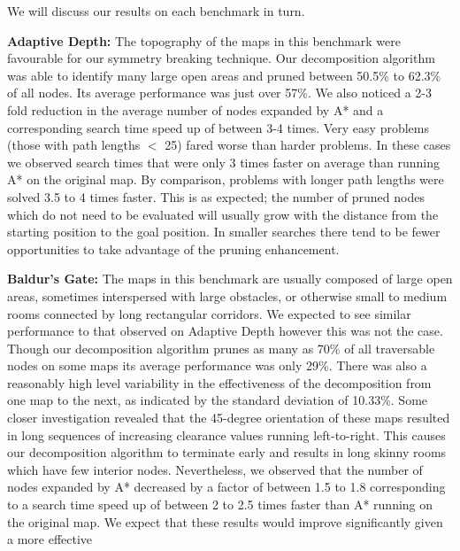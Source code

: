 We will discuss our results on each benchmark in turn.

\textbf{Adaptive Depth:} 
The topography of the maps in this benchmark were favourable for our
symmetry breaking technique.
Our decomposition algorithm was able to identify many large open areas and
pruned between 50.5\% to 62.3\% of all nodes.
Its average performance was just over 57\%. 
We also noticed a 2-3 fold reduction in the average number of nodes expanded 
by A* and a corresponding search time speed up of between 3-4 times.
Very easy problems (those with path lengths $<$ 25) fared worse than harder
problems. 
In these cases we observed search times that were only 3 times faster on average 
than running A* on the original map. 
By comparison, problems with longer path lengths were solved 3.5 to 4 times faster.
This is as expected; the number of pruned nodes which do not need to be evaluated
will usually grow with the distance from the starting position to the goal
position. In smaller searches there tend to be fewer opportunities to take advantage 
of the pruning enhancement.
%
\par
\textbf{Baldur's Gate: }
The maps in this benchmark are usually composed of large open areas, sometimes
interspersed with large obstacles, or otherwise small to medium rooms connected
by long rectangular corridors.
We expected to see similar performance to that observed on Adaptive Depth
however this was not the case.
Though our decomposition algorithm prunes as many as 70\% of all traversable nodes 
on some maps its average performance was only 29\%. 
There was also a reasonably high level variability in the effectiveness of the 
decomposition from one map to the next, as indicated by the standard deviation
of 10.33\%.
Some closer investigation revealed that the 45-degree orientation of these maps
resulted in long sequences of increasing clearance values running left-to-right.
This causes our decomposition algorithm to terminate early and results in long
skinny rooms which have few interior nodes.
Nevertheless, we observed that the number of nodes expanded by A* decreased by a
factor of between 1.5 to 1.8 corresponding to a search time speed up of between
2 to 2.5 times faster than A* running on the original map.
We expect that these results would improve significantly given a more effective

